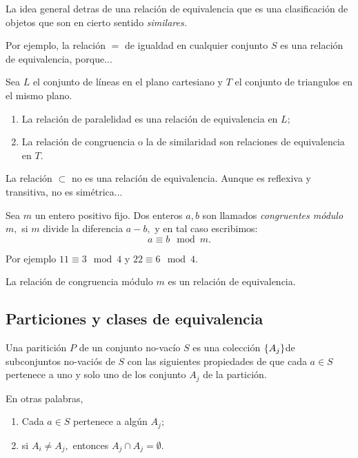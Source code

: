 	La idea general detras de una relaci\'on de equivalencia que es una clasificaci\'on de objetos que son en cierto sentido \emph{similares.} 
	
	
	Por ejemplo, la relaci\'on \emph{$=$} de igualdad en cualquier conjunto $S$ es una relaci\'on de equivalencia, porque...



	\begin{exmp}
		\label{lip:exmp:2.12.a}
		Sea $L$ el conjunto de l\'ineas en el plano cartesiano y $T$ el conjunto de triangulos en el mismo plano.
		
		\begin{enumerate}
			\item La relaci\'on de paralelidad es una relaci\'on de equivalencia en $L;$ 
			\item La relaci\'on de congruencia o la de similaridad son relaciones de equivalencia en $T.$
		\end{enumerate}
		
	\end{exmp}
	



	\begin{exmp}
		\label{lip:exmp:2.12.b}
		La relaci\'on $\subset$ no es una relaci\'on de equivalencia. Aunque es reflexiva y transitiva,  no es sim\'etrica...
	\end{exmp}
	



	\label{lip:exmp:2.12.c}
	Sea $m$ un entero positivo fijo. Dos enteros $a,b$ son llamados \emph{congruentes m\'odulo $m,$} si $m$ divide la diferencia $a-b,$ y en tal caso escribimos:
	$$
	a\equiv b \mod m.
	$$
	
	
	Por ejemplo $11\equiv 3 \mod 4$ y $22\equiv 6 \mod 4.$
	
	
	La relaci\'on de congruencia m\'odulo $m$ es un relaci\'on de equivalencia. 



\subsection{Particiones y clases de equivalencia}


	Una paritici\'on $P$ de un conjunto no-vac\'io $S$ es una colecci\'on $\left\{ A_{j} \right\}$de subconjuntos no-vaci\'os de $S$ con las siguientes propiedades de que cada $a\in S$ pertenece a uno y solo uno de los conjunto $A_{j}$ de la partici\'on.  
	
	En otras palabras,
	\begin{enumerate}
		\item Cada $a\in S$ pertenece a alg\'un $A_{j};$
		\item si $A_{i}\neq A_{j},$ entonces $A_{j}\cap A_{j}=\emptyset.$
		
	\end{enumerate}
	
